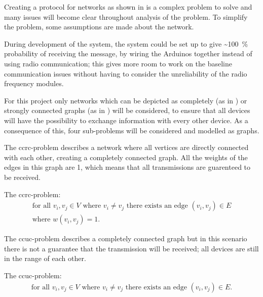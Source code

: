 \noindent
Creating a protocol for networks as shown in  is a complex problem to solve and many issues will become clear throughout analysis of the problem.
To simplify the problem, some assumptions are made about the network.

During development of the system, the system could be set up to give \textasciitilde100~\% probability of receiving the message, by wiring the Arduinos together instead of using radio communication; this gives more room to work on the baseline communication issues without having to consider the unreliability of the radio frequency modules.

For this project only networks which can be depicted as completely (as in ) or strongly connected graphs (as in ) will be considered, to ensure that all devices will have the possibility to exchange information with every other device.
As a consequence of this, four sub-problems will be considered and modelled as graphs.

\bigskip

\noindent The \gls{ccrc}-problem describes a network where all vertices are directly connected with each other, creating a completely connected graph.
All the weights of the edges in this graph are 1, which means that all transmissions are guarenteed to be received. 	

\begin{definition}\label{CCRCdef}
	The \acrshort{ccrc}-problem:
	\begin{align*}
		\text{for all } v_i, v_j \in V \text{ where } v_i \neq v_j \text{ there exists an edge } (v_i, v_j) \in E\\
		\text{where } w(v_i, v_j) = 1.
	\end{align*}
\end{definition}

\noindent The \gls{ccuc}-problem describes a completely connected graph but in this scenario there is not a guarantee that the transmission will be received; all devices are still in the range of each other.

\begin{definition}
	The \acrshort{ccuc}-problem:
	\begin{align*}
		\text{for all } v_i, v_j \in V \text{ where } v_i \neq v_j \text{ there exists an edge } (v_i, v_j) \in E.		%
	\end{align*}
\end{definition} 

